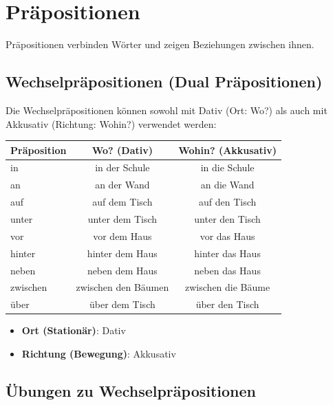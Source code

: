 \chapter{Präpositionen}
\label{cha:Praepositionen}

Präpositionen verbinden Wörter und zeigen Beziehungen zwischen ihnen.

\section{Wechselpräpositionen (Dual Präpositionen)}
\label{sec:Wechselpraep}

Die Wechselpräpositionen können sowohl mit Dativ (Ort: Wo?) als auch mit Akkusativ (Richtung: Wohin?) verwendet werden:

\begin{center}
\begin{tabular}{|l|c|c|}
\hline
\textbf{Präposition} & \textbf{Wo? (Dativ)} & \textbf{Wohin? (Akkusativ)} \\ \hline
in & in der Schule & in die Schule \\ \hline
an & an der Wand & an die Wand \\ \hline
auf & auf dem Tisch & auf den Tisch \\ \hline
unter & unter dem Tisch & unter den Tisch \\ \hline
vor & vor dem Haus & vor das Haus \\ \hline
hinter & hinter dem Haus & hinter das Haus \\ \hline
neben & neben dem Haus & neben das Haus \\ \hline
zwischen & zwischen den Bäumen & zwischen die Bäume \\ \hline
über & über dem Tisch & über den Tisch \\ \hline
\end{tabular}
\end{center}

\begin{tcolorbox}[title=Wichtig]
\begin{itemize}
    \item \textbf{Ort (Stationär)}: Dativ
    \item \textbf{Richtung (Bewegung)}: Akkusativ
\end{itemize}
\end{tcolorbox}

\section{Übungen zu Wechselpräpositionen}
\label{sec:WechselpraepUebungen}

